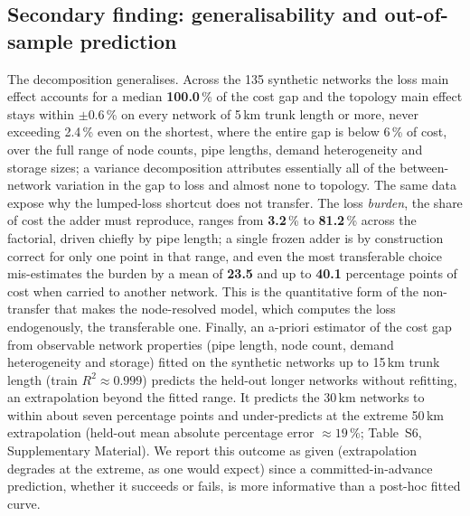 \documentclass[a4paper,fleqn]{cas-sc}
\begin{document}
\subsection{Secondary finding: generalisability and out-of-sample prediction}
\label{subsec:generalis}
The decomposition generalises. Across the 135 synthetic networks the loss main effect
accounts for a median \textbf{100.0}\,\% of the cost gap and the topology main
effect stays within $\pm$0.6\,\% on every network of 5\,km trunk length or more, never exceeding 2.4\,\% even on the shortest, where the entire gap is below 6\,\% of cost, over the full range of
node counts, pipe lengths, demand heterogeneity and storage sizes; a variance decomposition
attributes essentially all of the between-network variation in the gap to loss and almost none
to topology. The same data expose why the lumped-loss shortcut does not transfer. The loss
\emph{burden}, the share of cost the adder must reproduce, ranges from
\textbf{3.2}\,\% to \textbf{81.2}\,\% across the factorial, driven
chiefly by pipe length; a single frozen adder is by construction correct for only one point in
that range, and even the most transferable choice mis-estimates the burden by a mean of
\textbf{23.5} and up to \textbf{40.1} percentage points of cost
when carried to another network. This is the quantitative form of the non-transfer that makes
the node-resolved model, which computes the loss endogenously, the transferable one. Finally,
an a-priori estimator of the cost gap from observable network properties (pipe length, node
count, demand heterogeneity and storage) fitted on the synthetic networks up to 15\,km trunk
length (train $R^2\approx0.999$) predicts the held-out longer networks without refitting, an
extrapolation beyond the fitted range. It predicts the 30\,km networks to within about seven
percentage points and under-predicts at the extreme 50\,km extrapolation (held-out mean absolute
percentage error $\approx19$\,\%; Table~S6, Supplementary Material). We report this outcome as given
(extrapolation degrades at the extreme, as one would expect) since a committed-in-advance
prediction, whether it succeeds or fails, is more informative than a post-hoc fitted curve.
\end{document}
